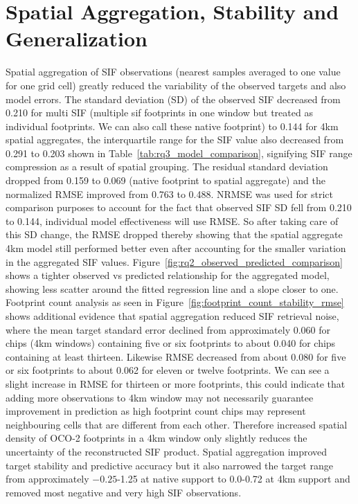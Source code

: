 \section{Spatial Aggregation, Stability and Generalization}

Spatial aggregation of SIF observations (nearest samples averaged to one value for one grid cell) greatly reduced the variability of the observed targets and also model errors. The standard deviation (SD) of the observed SIF decreased from 0.210 for multi SIF (multiple sif footprints in one window but treated as individual footprints. We can also call these native footprint) to 0.144 for 4km spatial aggregates, the interquartile range for the SIF value also decreased from 0.291 to 0.203 shown in Table~\ref{tab:rq3_model_comparison}, signifying SIF range compression as a result of spatial grouping. The residual standard deviation dropped from 0.159 to 0.069 (native footprint to spatial aggregate) and the normalized RMSE improved from 0.763 to 0.488. NRMSE was used for strict comparison purposes to account for the fact that observed SIF SD fell from 0.210 to 0.144, individual model effectiveness will use RMSE. So after taking care of this SD change, the RMSE dropped thereby showing that the spatial aggregate 4km model still performed better even after accounting for the smaller variation in the aggregated SIF values. Figure~\ref{fig:rq2_observed_predicted_comparison} shows a tighter observed vs predicted relationship for the aggregated model, showing less scatter around the fitted regression line and a slope closer to one. Footprint count analysis as seen in Figure~\ref{fig:footprint_count_stability_rmse} shows additional evidence that spatial aggregation reduced SIF retrieval noise, where the mean target standard error declined from approximately 0.060 for chips (4km windows) containing five or six footprints to about 0.040 for chips containing at least thirteen. Likewise RMSE decreased from about 0.080 for five or six footprints to about 0.062 for eleven or twelve footprints. We can see a slight increase in RMSE for thirteen or more footprints, this could indicate that adding more observations to 4km window may not necessarily guarantee improvement in prediction as high footprint count chips may represent neighbouring cells that are different from each other. Therefore increased spatial density of OCO-2 footprints in a 4km window only slightly reduces the uncertainty of the reconstructed SIF product. Spatial aggregation improved target stability and predictive accuracy but it also narrowed the target range from approximately $-0.25$-1.25 at native support to 0.0-0.72 at 4km support and removed most negative and very high SIF observations. 


